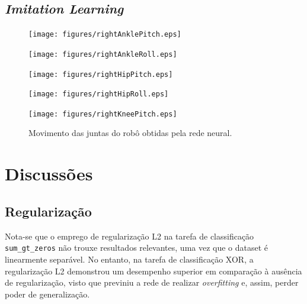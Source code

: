 \documentclass[a4paper,12pt]{article}
\begin{document}
\newpage

\subsection{\textit{Imitation Learning}}

\begin{figure}[htbp]
    \centering
    \begin{minipage}[b]{0.45\linewidth}
        \centering
        \texttt{[image: figures/rightAnklePitch.eps]}
        \label{fig:image1}
    \end{minipage}
    \hfill
    \begin{minipage}[b]{0.45\linewidth}
        \centering
        \texttt{[image: figures/rightAnkleRoll.eps]}
        \label{fig:image2}
    \end{minipage}
    
    \vspace{1em} %
    
    \begin{minipage}[b]{0.3\linewidth}
        \centering
        \texttt{[image: figures/rightHipPitch.eps]}
        \label{fig:image3}
    \end{minipage}
    \hfill
    \begin{minipage}[b]{0.3\linewidth}
        \centering
        \texttt{[image: figures/rightHipRoll.eps]}
        \label{fig:image4}
    \end{minipage}
    \hfill
    \begin{minipage}[b]{0.3\linewidth}
        \centering
        \texttt{[image: figures/rightKneePitch.eps]}
        \label{fig:image5}
    \end{minipage}
    
    \caption{Movimento das juntas do robô obtidas pela rede neural.}
    \label{fig:cinco_imagens}
\end{figure}

\section{Discussões}

\subsection{Regularização}

Nota-se que o emprego de regularização L2 na tarefa de classificação \texttt{sum\_gt\_zeros} não trouxe resultados relevantes, uma vez que o dataset é linearmente separável. No entanto, na tarefa de classificação XOR, a regularização L2 demonstrou um desempenho superior em comparação à ausência de regularização, visto que previniu a rede de realizar \textit{overfitting} e, assim, perder poder de generalização.
\end{document}
